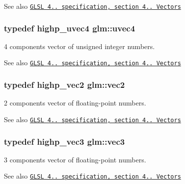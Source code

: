 \begin{DoxySeeAlso}{See also}
\href{http://www.opengl.org/registry/doc/GLSLangSpec.4.20.8.pdf}{\tt G\+L\+SL 4.. specification, section 4.. Vectors} 
\end{DoxySeeAlso}
\subsubsection[{\texorpdfstring{uvec4}{uvec4}}]{\setlength{\rightskip}{0pt plus 5cm}typedef highp\+\_\+uvec4 {\bf glm\+::uvec4}}\hypertarget{group__core__types_ga1c426d19627b32b14f0089f7f4ba7b1d}{}\label{group__core__types_ga1c426d19627b32b14f0089f7f4ba7b1d}
4 components vector of unsigned integer numbers.

\begin{DoxySeeAlso}{See also}
\href{http://www.opengl.org/registry/doc/GLSLangSpec.4.20.8.pdf}{\tt G\+L\+SL 4.. specification, section 4.. Vectors} 
\end{DoxySeeAlso}
\subsubsection[{\texorpdfstring{vec2}{vec2}}]{\setlength{\rightskip}{0pt plus 5cm}typedef highp\+\_\+vec2 {\bf glm\+::vec2}}\hypertarget{group__core__types_gaa1618f51db67eaa145db101d8c8431d8}{}\label{group__core__types_gaa1618f51db67eaa145db101d8c8431d8}
2 components vector of floating-\/point numbers.

\begin{DoxySeeAlso}{See also}
\href{http://www.opengl.org/registry/doc/GLSLangSpec.4.20.8.pdf}{\tt G\+L\+SL 4.. specification, section 4.. Vectors} 
\end{DoxySeeAlso}
\subsubsection[{\texorpdfstring{vec3}{vec3}}]{\setlength{\rightskip}{0pt plus 5cm}typedef highp\+\_\+vec3 {\bf glm\+::vec3}}\hypertarget{group__core__types_ga1c47e8b3386109bc992b6c48e91b0be7}{}\label{group__core__types_ga1c47e8b3386109bc992b6c48e91b0be7}
3 components vector of floating-\/point numbers.

\begin{DoxySeeAlso}{See also}
\href{http://www.opengl.org/registry/doc/GLSLangSpec.4.20.8.pdf}{\tt G\+L\+SL 4.. specification, section 4.. Vectors} 
\end{DoxySeeAlso}

